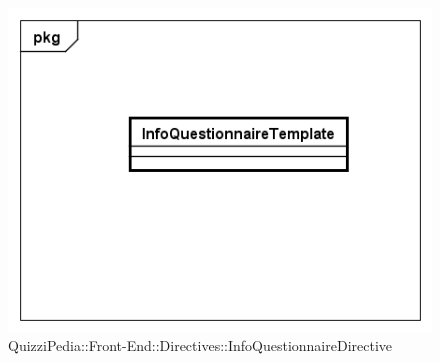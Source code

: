 		\begin{figure}[ht]
			\centering
			\includegraphics[scale=0.5,keepaspectratio]{UML/Classi/Front-End/QuizziPedia_Front-end_Templates_InfoQuestionnaireTemplate.png}
			\caption{QuizziPedia::Front-End::Directives::InfoQuestionnaireDirective}
		\end{figure} \FloatBarrier
		
